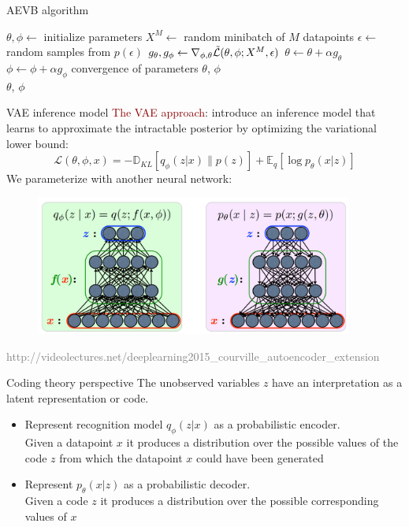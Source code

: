 \documentclass[unicode,11pt]{beamer}
\begin{document}
\begin{frame}{AEVB algorithm}
  \centering
  \begin{algorithmic}
    \State $\theta, \phi \gets$ initialize parameters
    \Repeat
       \State $X^M \gets$ random minibatch of $M$ datapoints
       \State $\epsilon \gets$ random samples from $p(\epsilon)$
       \State $g_\theta, g_\phi \gets \nabla_{\phi, \theta} \mathcal{\tilde{L}}(\theta, \phi; X^M, \epsilon)$
       \State $\theta \gets \theta + \alpha g_\theta$
       \State $\phi \gets \phi + \alpha g_\phi$
    \Until convergence of parameters $\theta$, $\phi$ \\
    \Return $\theta$, $\phi$
  \end{algorithmic}
\end{frame}


\begin{frame}[fragile]{VAE inference model}
  \textcolor{darkred}{The VAE approach}: introduce an inference model that
  learns to approximate the intractable posterior by optimizing the variational lower bound:
  $$ \mathcal{L}(\theta, \phi, x) = -\mathbb{D}_{KL}[q_{\phi} (z|x) \parallel p(z)] +
  \mathbb{E}_q [\log p_\theta (x|z)] $$
  We parameterize with another neural network:
  \begin{figure}[htbp]
    \includegraphics[height=130pt, keepaspectratio = true]{images/vae}
  \end{figure}
  \tiny \textcolor{gray}{http://videolectures.net/deeplearning2015\_courville\_autoencoder\_extension}
\end{frame}

\begin{frame}[fragile]{Coding theory perspective}
  The unobserved variables $z$ have an interpretation as a latent representation or code.

  \begin{itemize}
    \item Represent recognition model $q_{\phi}(z|x)$ as a probabilistic encoder.\\
        Given a datapoint $x$ it produces a distribution over the possible values of the code $z$
        from which the datapoint $x$ could have been generated
    \item Represent $p_{\theta}(x|z)$ as a probabilistic decoder.\\
        Given a code $z$ it produces a distribution over the possible corresponding values of $x$
  \end{itemize}
\end{frame}
\end{document}
